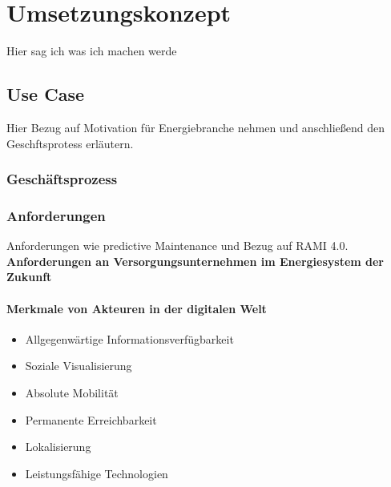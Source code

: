 \section{Umsetzungskonzept}
Hier sag ich was ich machen werde

\subsection{Use Case}

Hier Bezug auf Motivation für Energiebranche nehmen und anschließend den Geschftsprotess erläutern.

\subsubsection{Geschäftsprozess}

\subsubsection{Anforderungen}
Anforderungen wie predictive Maintenance und Bezug auf RAMI 4.0.
\newline
\textbf{Anforderungen an Versorgungsunternehmen im Energiesystem der Zukunft \citep[S. 19]{Doleski2016}}

\paragraph{Merkmale von Akteuren in der digitalen Welt}
\begin{itemize}
  \item Allgegenwärtige Informationsverfügbarkeit
  \item Soziale Visualisierung
  \item Absolute Mobilität
  \item Permanente Erreichbarkeit
  \item Lokalisierung
  \item Leistungsfähige Technologien
\end{itemize}


